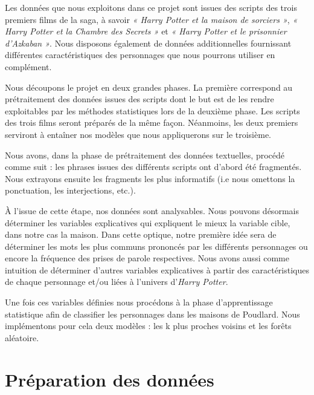 \documentclass[11pt]{article}
\begin{document}
\begin{center}
Les données que nous exploitons dans ce projet sont issues des scripts des trois premiers films de la saga, à savoir \textit{« Harry Potter et la maison de sorciers »}, \textit{« Harry Potter et la Chambre des Secrets »} et \textit{« Harry Potter et le prisonnier d'Azkaban »}. Nous disposons également de données additionnelles fournissant différentes caractéristiques des personnages que nous pourrons utiliser en complément.\par

Nous découpons le projet en deux grandes phases. La première correspond au prétraitement des données issues des scripts dont le but est de les rendre exploitables par les méthodes statistiques lors de la deuxième phase.
Les scripts des trois films seront préparés de la même façon. Néanmoins, les deux premiers serviront à entaîner nos modèles que nous appliquerons sur le troisième.\par

Nous avons, dans la phase de prétraitement des données textuelles, procédé comme suit : les phrases issues des différents scripts ont d'abord été fragmentés.
Nous extrayons ensuite les fragments les plus informatifs (i.e nous omettons la ponctuation, les interjections, etc.).\par
À l'issue de cette étape, nos données sont analysables. Nous pouvons désormais déterminer les variables explicatives qui expliquent le mieux la variable cible, dans notre cas la maison. Dans cette optique, notre première idée sera de déterminer les mots les plus communs prononcés par les différents personnages ou encore la fréquence des prises de parole respectives. Nous avons aussi comme intuition de déterminer d'autres variables explicatives à partir des caractéristiques de chaque personnage et/ou liées à l'univers d'\textit{Harry Potter}.\par
Une fois ces variables définies nous procédons à la phase d'apprentissage statistique afin de classifier les personnages dans les maisons de Poudlard. Nous implémentons pour cela deux modèles : les k plus proches voisins et les forêts aléatoire.

\newpage

\section{Préparation des données}


\end{center}
\end{document}
